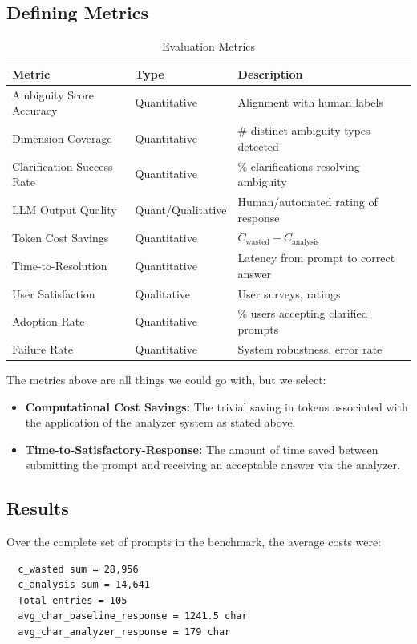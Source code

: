 \documentclass[conference]{IEEEtran}
\begin{document}
\subsection{Defining Metrics}
\begin{table}[H]
\caption{Evaluation Metrics}
\label{tab:metrics}
\centering
\begin{tabular}{@{}lll@{}}
\toprule
\textbf{Metric}              & \textbf{Type}      & \textbf{Description}                           \\ \midrule
Ambiguity Score Accuracy   & Quantitative      & Alignment with human labels           \\
Dimension Coverage         & Quantitative      & \# distinct ambiguity types detected   \\
Clarification Success Rate & Quantitative      & \% clarifications resolving ambiguity  \\
LLM Output Quality         & Quant/Qualitative & Human/automated rating of response    \\
Token Cost Savings         & Quantitative      & \( C_{\text{wasted}} - C_{\text{analysis}} \)       \\
Time-to-Resolution         & Quantitative      & Latency from prompt to correct answer \\
User Satisfaction          & Qualitative       & User surveys, ratings                 \\
Adoption Rate              & Quantitative      & \% users accepting clarified prompts   \\
Failure Rate               & Quantitative      & System robustness, error rate         \\ \bottomrule
\end{tabular}
\end{table}
The metrics above are all things we could go with, but we select:
\begin{itemize}
    \item \textbf{Computational Cost Savings:}
    The trivial saving in tokens associated with the application of the analyzer system as stated above.
    \item \textbf{Time-to-Satisfactory-Response:}
    The amount of time saved between submitting the prompt and receiving an acceptable answer via the analyzer.
\end{itemize}

\subsection{Results}
Over the complete set of prompts in the benchmark, the average costs were:
\begin{verbatim}
  c_wasted sum = 28,956
  c_analysis sum = 14,641
  Total entries = 105
  avg_char_baseline_response = 1241.5 char
  avg_char_analyzer_response = 179 char
\end{verbatim}
\end{document}
